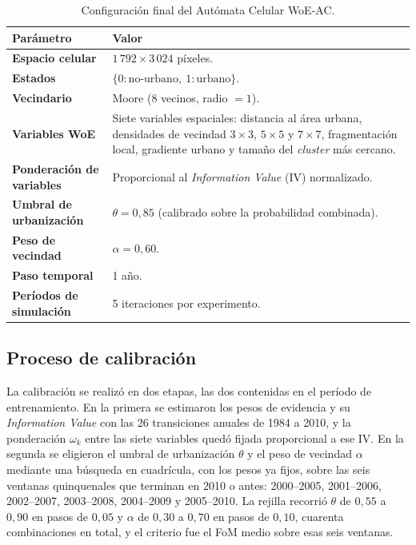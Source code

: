 \begin{table}[htbp]
\centering
\caption{Configuración final del Autómata Celular WoE-AC.}
\label{tab:ac_final_config}
\begin{tabularx}{\textwidth}{@{}>{\bfseries}p{}X@{}}
\toprule
Parámetro & Valor \\
\midrule
Espacio celular & $1\,792 \times 3\,024$ píxeles. \\
Estados & $\{0:\text{no-urbano},\ 1:\text{urbano}\}$. \\
Vecindario & Moore (8 vecinos, radio $=1$). \\
Variables WoE & Siete variables espaciales: distancia al área urbana, densidades de vecindad $3\times3$, $5\times5$ y $7\times7$, fragmentación local, gradiente urbano y tamaño del \textit{cluster} más cercano. \\
Ponderación de variables & Proporcional al \textit{Information Value} (IV) normalizado. \\
Umbral de urbanización & $\theta = 0{,}85$ (calibrado sobre la probabilidad combinada). \\
Peso de vecindad & $\alpha = 0{,}60$. \\
Paso temporal & 1 año. \\
Períodos de simulación & 5 iteraciones por experimento. \\
\bottomrule
\end{tabularx}
\end{table}

\subsection{Proceso de calibración}

La calibración se realizó en dos etapas, las dos contenidas en el período de entrenamiento. En la primera se estimaron los pesos de evidencia y su \textit{Information Value} con las 26 transiciones anuales de 1984 a 2010, y la ponderación $\omega_k$ entre las siete variables quedó fijada proporcional a ese IV. En la segunda se eligieron el umbral de urbanización $\theta$ y el peso de vecindad $\alpha$ mediante una búsqueda en cuadrícula, con los pesos ya fijos, sobre las seis ventanas quinquenales que terminan en 2010 o antes: 2000--2005, 2001--2006, 2002--2007, 2003--2008, 2004--2009 y 2005--2010. La rejilla recorrió $\theta$ de $0{,}55$ a $0{,}90$ en pasos de $0{,}05$ y $\alpha$ de $0{,}30$ a $0{,}70$ en pasos de $0{,}10$, cuarenta combinaciones en total, y el criterio fue el FoM medio sobre esas seis ventanas.

